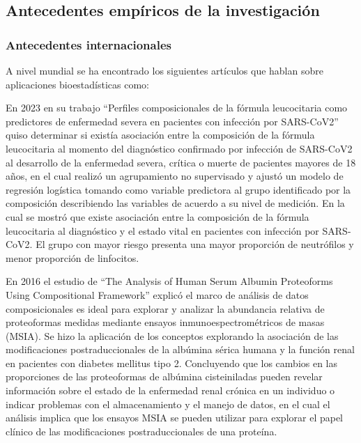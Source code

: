 
\subsection{Antecedentes empíricos de la investigación}

\subsubsection{Antecedentes internacionales}
A nivel mundial se ha encontrado los siguientes artículos que hablan sobre aplicaciones bioestadísticas como:

En 2023 \citep{Enciso_Olivera_2023} en su trabajo ``Perfiles composicionales de la fórmula leucocitaria como predictores de enfermedad severa en pacientes con infección por SARS-CoV2'' quiso determinar si existía asociación entre la composición de la fórmula leucocitaria al momento del diagnóstico confirmado por infección de SARS-CoV2 al desarrollo de la enfermedad severa, crítica o muerte de pacientes mayores de 18 años, en el cual realizó un agrupamiento no supervisado y ajustó un modelo de regresión logística tomando como variable predictora al grupo identificado por la composición describiendo las variables de acuerdo a su nivel de medición. En la cual se mostró que existe asociación entre la composición de la fórmula leucocitaria al diagnóstico y el estado vital en pacientes con infección por SARS-CoV2. El grupo con mayor riesgo presenta una mayor proporción de neutrófilos y menor proporción de linfocitos.

En 2016 el estudio de \citep{Sinari_2016} ``The Analysis of Human Serum Albumin Proteoforms Using Compositional Framework'' explicó el marco de análisis de datos composicionales es ideal para explorar y analizar la abundancia relativa de proteoformas medidas mediante ensayos inmunoespectrométricos de masas (MSIA). Se hizo la aplicación de los conceptos explorando la asociación de las modificaciones postraduccionales de la albúmina sérica humana y la función renal en pacientes con diabetes mellitus tipo 2. Concluyendo que los cambios en las proporciones de las proteoformas de albúmina cisteiniladas pueden revelar información sobre el estado de la enfermedad renal crónica en un individuo o indicar problemas con el almacenamiento y el manejo de datos, en el cual el análisis implica que los ensayos MSIA se pueden utilizar para explorar el papel clínico de las modificaciones postraduccionales de una proteína.


